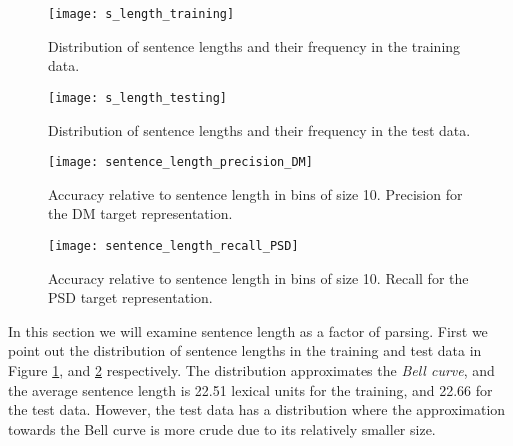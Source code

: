 \begin{figure}[h]
    \centering
    \begin{minipage}{0.8\textwidth}
        \centering
        \texttt{[image: s\_length\_training]}
    \end{minipage}\hfill
    \caption{Distribution of sentence lengths and their frequency in the training data.}
    \label{fig:sentence_length_1}
\end{figure}

\begin{figure}[h]
    \centering
    \begin{minipage}{0.8\textwidth}
        \centering
        \texttt{[image: s\_length\_testing]}
    \end{minipage}
    \caption{Distribution of sentence lengths and their frequency in the test data.}
    \label{fig:sentence_length_2}
\end{figure}

\begin{figure}[h]
    \centering
    \begin{minipage}{0.8\textwidth}
        \centering
        \texttt{[image: sentence\_length\_precision\_DM]}
    \end{minipage}
    \caption{Accuracy relative to sentence length in bins of size 10. Precision for the DM target representation.}
    \label{fig:s_length_DM}
\end{figure}

\begin{figure}[h]
    \centering
    \begin{minipage}{0.8\textwidth}
        \centering
        \texttt{[image: sentence\_length\_recall\_PSD]}
    \end{minipage}\hfill
    \caption{Accuracy relative to sentence length in bins of size 10. Recall for the PSD target representation.}
    \label{fig:s_length_PSD}
\end{figure}

In this section we will examine sentence length as a factor of parsing. First we point out the distribution of sentence lengths in the training and test data in Figure \ref{fig:sentence_length_1}, and \ref{fig:sentence_length_2} respectively. The distribution approximates the \textit{Bell curve}, and the average sentence length is 22.51 lexical units for the training, and 22.66 for the test data. However, the test data has a distribution where the approximation towards the Bell curve is more crude due to its relatively smaller size.

